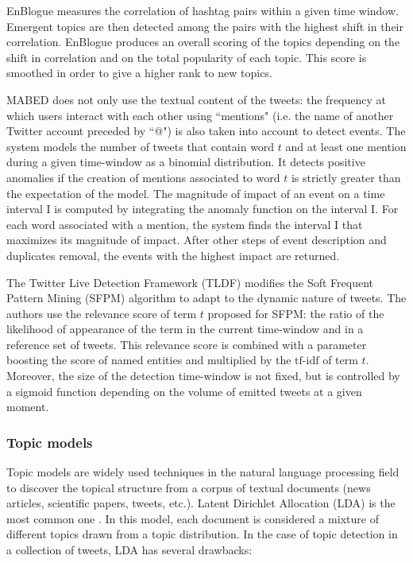 		EnBlogue \citep{alvanaki_see_2012} measures the correlation of hashtag pairs within a given time window. Emergent topics are then detected among the pairs with the highest shift in their correlation. EnBlogue produces an overall scoring of the topics depending on the shift in correlation and on the total popularity of each topic. This score is smoothed in order to give a higher rank to new topics. 
		
		MABED \citep{guille_event_2015} does not only use the textual content of the tweets: the frequency at which users interact with each other using ``mentions" (i.e. the name of another Twitter account preceded by ``@") is also taken into account to detect events. The system models the number of tweets that contain word $t$ and at least one mention during a given time-window as a binomial distribution. It detects positive anomalies if the creation of mentions associated to word $t$ is strictly greater than the expectation of the model. The magnitude of impact of an event on a time interval I is computed by integrating the anomaly function on the interval I. For each word associated with a mention, the system finds the interval I that maximizes its magnitude of impact. After other steps of event description and duplicates removal, the events with the highest impact are returned.
		
		The Twitter Live Detection Framework (TLDF) \citep{gaglio_framework_2016} modifies the Soft Frequent Pattern Mining (SFPM) algorithm \citep{petkos_soft_2014} to adapt to the dynamic nature of tweets. The authors use the relevance score of term $t$ proposed for SFPM: the ratio of the likelihood of appearance of the term in the current time-window and in a reference set of tweets. This relevance score is combined with a parameter boosting the score of named entities and multiplied by the $\mbox{tf-idf}$ of term $t$. Moreover, the size of the detection time-window is not fixed, but is controlled by a sigmoid function depending on the volume of emitted tweets at a given moment.
	
	\subsubsection{Topic models} 
	\label{topic models}
	Topic models are widely used techniques in the natural language processing field to discover the topical structure from a corpus of textual documents (news articles, scientific papers, tweets, etc.). Latent Dirichlet Allocation (LDA) is the most common one \citep{blei_latent_2003}. In this model, each document is considered a mixture of different topics drawn from a topic distribution. In the case of topic detection in a collection of tweets, LDA has several drawbacks: 
	
